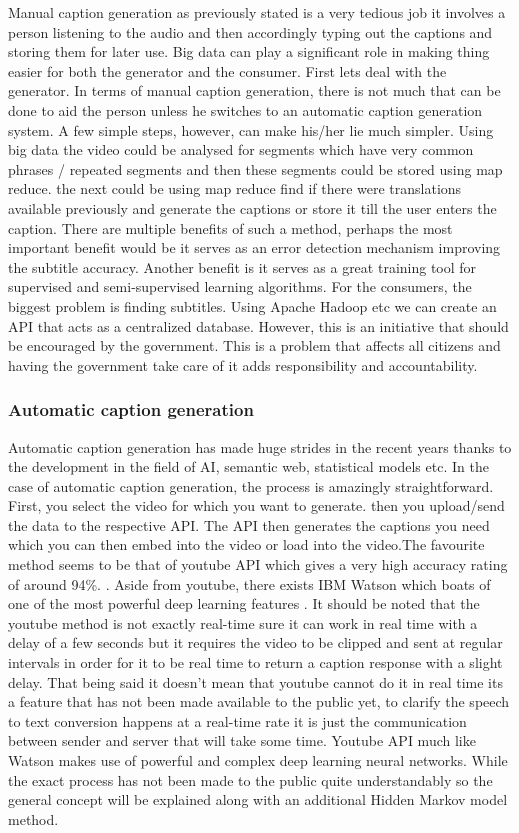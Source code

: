 \documentclass[sigconf]{acmart}
\begin{document}
Manual caption generation as previously stated is a very tedious job it involves a person listening to the audio and then accordingly typing out the captions and storing them for later use. Big data can play a significant role in making thing easier for both the generator and the consumer. First lets deal with the generator. In terms of manual caption generation, there is not much that can be done to aid the person unless he switches to an automatic caption generation system. A few simple steps, however, can make his/her lie much simpler. Using big data the video could be analysed for segments which have very common phrases / repeated segments and then these segments could be stored using map reduce. the next could be using map reduce find if there were translations available previously and generate the captions or store it till the user enters the caption. There are multiple benefits of such a method, perhaps the most important benefit would be it serves as an error detection mechanism improving the subtitle accuracy. Another benefit is it serves as a great training tool for supervised and semi-supervised learning algorithms. For the consumers, the biggest problem is finding subtitles. Using Apache Hadoop etc we can create an API that acts as a centralized database. However, this is an initiative that should be encouraged by the government. This is a problem that affects all citizens and having the government take care of it adds responsibility and accountability.

\subsubsection{Automatic caption generation}

Automatic caption generation has made huge strides in the recent years thanks to the development in the field of AI, semantic web, statistical models etc. In the case of automatic caption generation, the process is amazingly straightforward. First, you select the video for which you want to generate. then you upload/send the data to the respective API. The API then generates the captions you need which you can then embed into the video or load into the video.The favourite method seems to be that of youtube API which gives a very high accuracy rating of around 94\%. \cite{TheDeafCaptioner2017} .  Aside from youtube, there exists IBM Watson which boats of one of the most powerful deep learning features \cite{Wkipedia2017ibm}. It should be noted that the youtube method is not exactly real-time sure it can work in real time with a delay of a few seconds but it requires the video to be clipped and sent at regular intervals in order for it to be real time to return a caption response with a slight delay. That being said it doesn't mean that youtube cannot do it in real time its a feature that has not been made available to the public yet, to clarify the speech to text conversion happens at a real-time rate it is just the communication between sender and server that will take some time. Youtube API much like Watson makes use of powerful and complex deep learning neural networks. While the exact process has not been made to the public quite understandably so the general concept will be explained along with an additional Hidden Markov model method.
\newline
\end{document}
